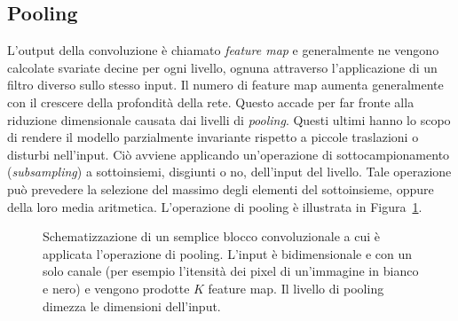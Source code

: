 \subsection{Pooling}
L'output della convoluzione è chiamato \emph{feature map} e generalmente ne
vengono calcolate svariate decine per ogni livello, ognuna attraverso
l'applicazione di un filtro diverso sullo stesso input. Il numero di feature
map aumenta generalmente con il crescere della profondità della rete. Questo
accade per far fronte alla riduzione dimensionale causata dai livelli di
\emph{pooling}. Questi ultimi hanno lo scopo di rendere il modello parzialmente
invariante rispetto a piccole traslazioni o disturbi nell'input. Ciò avviene
applicando un'operazione di sottocampionamento (\emph{subsampling}) a
sottoinsiemi, disgiunti o no, dell'input del livello. Tale operazione può prevedere la
selezione del massimo degli elementi del sottoinsieme, oppure della loro media
aritmetica. L'operazione di pooling è illustrata in Figura~\ref{fig:pooling}.
\begin{figure}[!htp]
  \caption{%
    Schematizzazione di un semplice blocco convoluzionale a cui è applicata
    l'operazione di pooling. L'input è bidimensionale e con un solo canale (per
    esempio l'itensità dei pixel di un'immagine in bianco e nero) e vengono
    prodotte \(K\) feature map. Il livello di pooling dimezza le dimensioni
    dell'input.
  }%
  \label{fig:pooling}
\end{figure}




